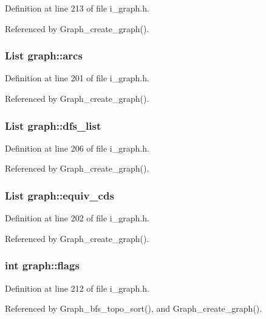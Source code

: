 Definition at line 213 of file i\_\-graph.h.

Referenced by Graph\_\-create\_\-graph().
\subsubsection{\setlength{\rightskip}{0pt plus 5cm}\bf{List} \bf{graph::arcs}}\label{structgraph_b044b9d224c67cf7ae46c8b7f2d38d23}




Definition at line 201 of file i\_\-graph.h.

Referenced by Graph\_\-create\_\-graph().
\subsubsection{\setlength{\rightskip}{0pt plus 5cm}\bf{List} \bf{graph::dfs\_\-list}}\label{structgraph_134b6dc026aea10dd78aebaa0f153219}




Definition at line 206 of file i\_\-graph.h.

Referenced by Graph\_\-create\_\-graph().
\subsubsection{\setlength{\rightskip}{0pt plus 5cm}\bf{List} \bf{graph::equiv\_\-cds}}\label{structgraph_5336cb97da968c6aa2e209de8ec52c49}




Definition at line 202 of file i\_\-graph.h.

Referenced by Graph\_\-create\_\-graph().
\subsubsection{\setlength{\rightskip}{0pt plus 5cm}int \bf{graph::flags}}\label{structgraph_444f2d469e37137f9a40cac7a926ba0c}




Definition at line 212 of file i\_\-graph.h.

Referenced by Graph\_\-bfs\_\-topo\_\-sort(), and Graph\_\-create\_\-graph().
